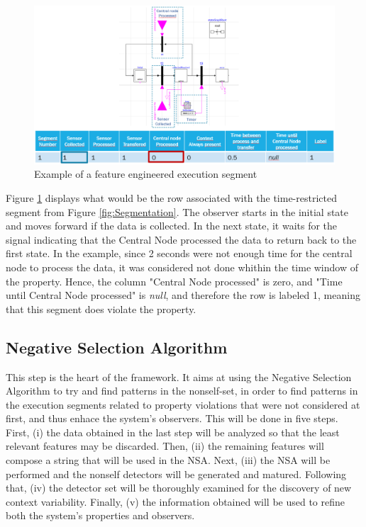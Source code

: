 \begin{figure}[!h]
	\centering
	\includegraphics[width=0.999\textwidth, keepaspectratio]{img/modelica_observer_signals.png}
	\caption{Example of a feature engineered execution segment}
	\label{fig:FeatureEngResult}
\end{figure}

Figure \ref{fig:FeatureEngResult} displays what would be the row associated with the time-restricted segment from Figure \ref{fig:Segmentation}. The observer starts in the initial state and moves forward if the data is collected. In the next state, it waits for the signal indicating that the Central Node processed the data to return back to the first state. In the example, since 2 seconds were not enough time for the central node to process the data, it was considered not done whithin the time window of the property. Hence, the column "Central Node processed" is zero, and "Time until Central Node processed" is \textit{null}, and therefore the row is labeled 1, meaning that this segment does violate the property.

\subsection{Negative Selection Algorithm}
\label{sec:prop_NSA}

This step is the heart of the framework. It aims at using the Negative Selection Algorithm to try and find patterns in the nonself-set, in order to find patterns in the execution segments related to property violations that were not considered at first, and thus enhace the system's observers. This will be done in five steps. First, (i) the data obtained in the last step will be analyzed so that the least relevant features may be discarded. Then, (ii) the remaining features will compose a string that will be used in the NSA. Next, (iii) the NSA will be performed and the nonself detectors will be generated and matured. Following that, (iv) the detector set will be thoroughly examined for the discovery of new context variability. Finally, (v) the information obtained will be used to refine both the system's properties and observers.

